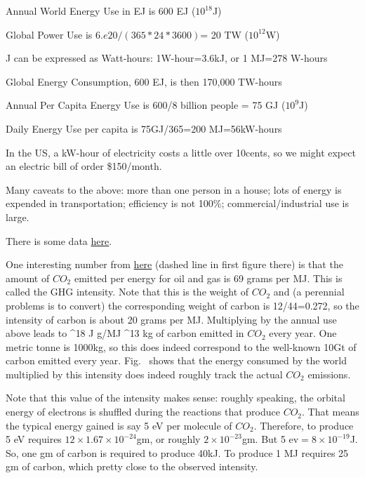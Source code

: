 \documentclass[11pt]{book}
\begin{document}
\bei
\item
Annual World Energy Use in EJ is 600 EJ ($10^{18}$J)
\item
Global Power Use is $6.e20/(365*24*3600)$= 20 TW ($10^{12}$W)
\item 
J can be expressed as Watt-hours: 1W-hour=3.6kJ, or 1 MJ=278 W-hours
\item 
Global Energy Consumption, 600 EJ,  is then 170,000 TW-hours 
\item Annual Per Capita Energy Use is 600/8 billion people = 75 GJ ($10^9$J)
\item
Daily Energy Use per capita is 75GJ/365=200 MJ=56kW-hours
\item In the US, a kW-hour of electricity costs a little over 10cents, so we might expect an electric bill of order \$150/month.
\item Many caveats to the above: more than one person in a house; lots of energy is expended in transportation; efficiency is not 100\%; commercial/industrial use  is large.
\eei

There is some data \href{https://github.com/owid/co2-data}{here}.

One interesting number from \href{https://www.science.org/doi/10.1126/science.abh0687}{here} (dashed line in first figure there) is that the amount of $CO_2$ emitted per energy for oil and gas is 69 grams per MJ. This is called the GHG intensity. Note that this is the weight of $CO_2$ and (a perennial problems is to convert) the corresponding weight of carbon is 12/44=0.272, so the intensity of carbon is about 20 grams per MJ. Multiplying by the annual use above leads to 
^{18} J  g/MJ ^{13} kg
\ee
of carbon emitted in $CO_2$ every year. One metric tonne is 1000kg, so this does indeed correspond to the well-known 10Gt of carbon emitted every year.
Fig.~ shows that the energy consumed by the world multiplied by this intensity does indeed roughly track the actual $CO_2$ emissions.

Note that this value of the intensity makes sense: roughly speaking, the orbital energy of electrons is shuffled during the reactions that produce $CO_2$. That means the typical energy gained is say 5 eV per molecule of $CO_2$. Therefore, to produce 5 eV requires $12\times 1.67\times 10^{-24}$gm, or roughly $2\times10^{-23}$gm. But 5 ev$=8\times 10^{-19}$J. So, one gm of carbon is required to produce 40kJ. To produce 1 MJ requires 25 gm of carbon, which pretty close to the observed intensity.
\end{document}
